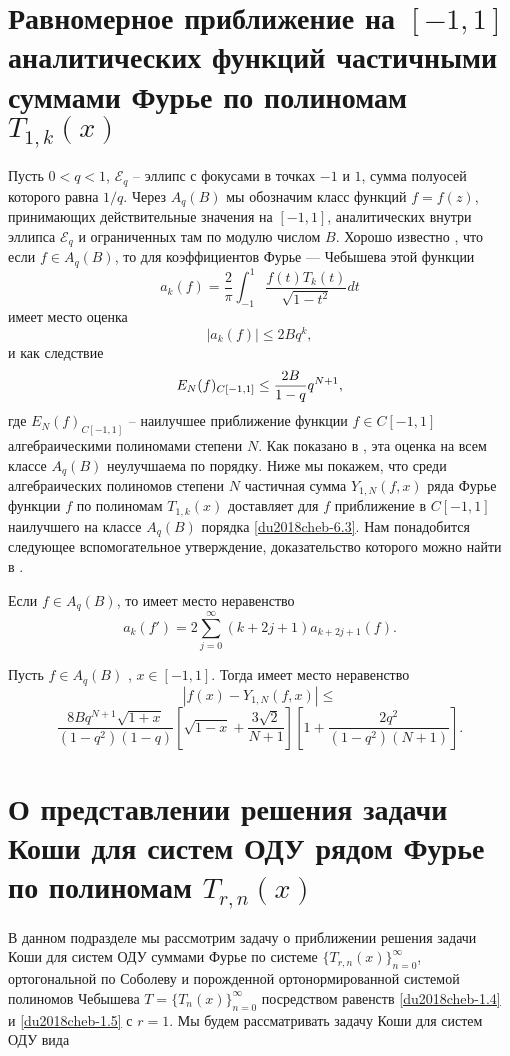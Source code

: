\section{Равномерное приближение на $[-1,1]$ аналитических функций частичными суммами Фурье по полиномам $T_{1,k}(x)$}
Пусть $0<q<1$, $\mathcal{E}_q$ -- эллипс с фокусами в точках
$-1$ и $1$, сумма полуосей которого равна $1/q$.
Через $A_q(B)$ мы обозначим класс функций $f=f(z)$,
принимающих действительные значения на $[-1,1]$, аналитических
внутри эллипса $\mathcal{E}_q$ и ограниченных там по модулю числом
$B$. Хорошо известно \cite{Timan}, что если
$f\in A_q(B)$, то для коэффициентов Фурье --- Чебышева этой функции
\begin{equation}\label{du2018cheb-6.1}
a_k(f)=\frac{2}{\pi}\int_{-1}^{1}\frac{f(t)T_k(t)}{\sqrt{1-t^2}}dt
\end{equation}
имеет место оценка
\begin{equation}\label{du2018cheb-6.2}
|a_k(f)|\le2Bq^k,
\end{equation}
и как следствие
\begin{equation}\label{du2018cheb-6.3}
E_N(f)_{C[-1,1]}\le{2B\over1-q}q^{N+1},
\end{equation}
где $E_N(f)_{C[-1,1]}$ -- наилучшее приближение функции $f\in C[-1,1]$ алгебраическими полиномами степени $N$. Как показано в \cite{du2018cheb-Ahiezer}, эта оценка на всем классе  $A_q(B)$ неулучшаема по порядку.  Ниже мы  покажем, что среди алгебраических полиномов степени $N$ частичная сумма $Y_{1,N}(f,x)$ ряда Фурье функции $f$ по полиномам $T_{1,k}(x)$    доставляет для $f$ приближение в $C[-1,1]$ наилучшего на классе $A_q(B)$ порядка \eqref{du2018cheb-6.3}. Нам понадобится следующее    вспомогательное утверждение, доказательство которого можно найти  в \cite{Pash}.
\begin{lemma}\label{du2018cheb-lemC} Если $f\in A_q(B)$, то имеет место неравенство
	$$
	a_k(f')=2\sum_{j=0}^\infty(k+2j+1)a_{k+2j+1}(f).
	$$
\end{lemma}

\begin{theorem} \label{du2018cheb-th4}    Пусть  $f\in A_q(B)$ , $x\in[-1,1]$. Тогда имеет  место неравенство
	$$
	|f(x)- Y_{1,N}(f,x)|\le
	$$
	$$
	\frac{8Bq^{N+1}\sqrt{1+x}}{(1-q^2)(1-q)}\left[\sqrt{1-x}+\frac{3\sqrt{2}}{N+1}\right]\left[1+
	\frac{2q^2}{(1-q^2)(N+1)}\right].
	$$
\end{theorem}

\section{О представлении решения задачи Коши для систем ОДУ рядом Фурье по полиномам $T_{r,n}(x)$}
В данном подразделе мы рассмотрим задачу о приближении решения задачи Коши для систем ОДУ  суммами  Фурье по системе $\{T_{r,n}(x)\}_{n=0}^\infty$, ортогональной по Соболеву и порожденной ортонормированной системой полиномов Чебышева $T=\{T_{n}(x)\}_{n=0}^\infty$ посредством равенств \eqref{du2018cheb-1.4} и \eqref{du2018cheb-1.5} с $r=1$.
 Мы будем рассматривать задачу Коши для систем ОДУ вида

